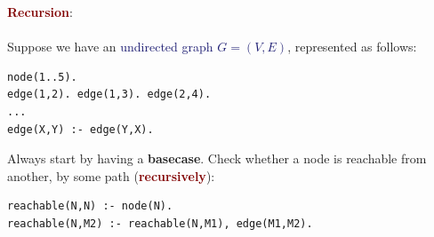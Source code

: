 \newpage

{\Large \textbf{\textcolor{Maroon}{Recursion}}}: \\
\\
Suppose we have an \textcolor{MidnightBlue}{undirected graph $G = (V,E)$}, represented as follows:
\begin{lstlisting}
node(1..5).
edge(1,2). edge(1,3). edge(2,4).
...
edge(X,Y) :- edge(Y,X).
\end{lstlisting}

\vspace{0.35cm}

Always start by having a \textbf{basecase}. Check whether a node is reachable from another, by some path (\textbf{\textcolor{Maroon}{recursively}}):
\begin{lstlisting}
reachable(N,N) :- node(N).
reachable(N,M2) :- reachable(N,M1), edge(M1,M2).
\end{lstlisting}